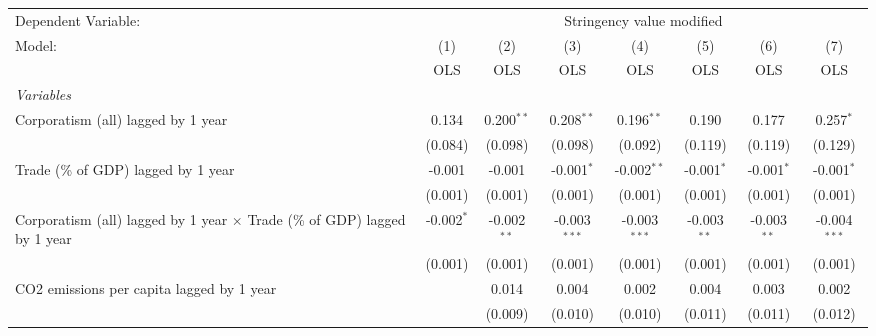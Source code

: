 
\begingroup
\centering
\begin{tabular}{lccccccc}
   \toprule
   Dependent Variable: & \multicolumn{7}{c}{Stringency value modified}\\
   Model:                                                                           & (1)          & (2)           & (3)            & (4)            & (5)           & (6)           & (7)\\  
                                                                                    &  OLS         & OLS           & OLS            & OLS            & OLS           & OLS           & OLS\\  
   \midrule
   \emph{Variables}\\
   Corporatism (all) lagged by 1 year                                               & 0.134        & 0.200$^{**}$  & 0.208$^{**}$   & 0.196$^{**}$   & 0.190         & 0.177         & 0.257$^{*}$\\   
                                                                                    & (0.084)      & (0.098)       & (0.098)        & (0.092)        & (0.119)       & (0.119)       & (0.129)\\   
   Trade (\% of GDP) lagged by 1 year                                               & -0.001       & -0.001        & -0.001$^{*}$   & -0.002$^{**}$  & -0.001$^{*}$  & -0.001$^{*}$  & -0.001$^{*}$\\   
                                                                                    & (0.001)      & (0.001)       & (0.001)        & (0.001)        & (0.001)       & (0.001)       & (0.001)\\   
   Corporatism (all) lagged by 1 year $\times$ Trade (\% of GDP) lagged by 1 year   & -0.002$^{*}$ & -0.002$^{**}$ & -0.003$^{***}$ & -0.003$^{***}$ & -0.003$^{**}$ & -0.003$^{**}$ & -0.004$^{***}$\\   
                                                                                    & (0.001)      & (0.001)       & (0.001)        & (0.001)        & (0.001)       & (0.001)       & (0.001)\\   
   CO2 emissions per capita lagged by 1 year                                        &              & 0.014         & 0.004          & 0.002          & 0.004         & 0.003         & 0.002\\   
                                                                                    &              & (0.009)       & (0.010)        & (0.010)        & (0.011)       & (0.011)       & (0.012)\\   

\end{tabular}
